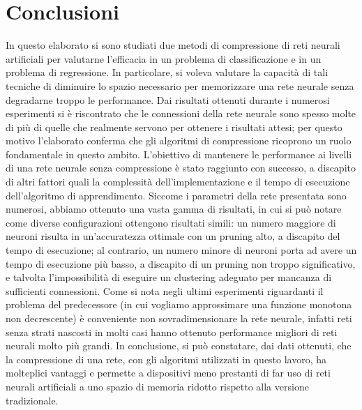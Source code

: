 \documentclass[11pt,a4paper,twoside,
openright]{book}
\begin{document}
	
	
	
\chapter*{Conclusioni}
In questo elaborato si sono studiati due metodi di compressione di reti neurali artificiali per valutarne l’efficacia in un problema di classificazione e in un problema di regressione. In particolare, si voleva valutare la capacità di tali tecniche di diminuire lo spazio necessario per memorizzare una rete neurale senza degradarne troppo le performance. Dai risultati ottenuti durante i numerosi esperimenti si è riscontrato che le connessioni della rete neurale sono spesso molte di più di quelle che realmente servono per ottenere i risultati attesi; per questo motivo l’elaborato conferma che gli algoritmi di compressione ricoprono un ruolo fondamentale in questo ambito. L’obiettivo di mantenere le performance ai livelli di una rete neurale senza compressione è stato raggiunto con successo, a discapito di altri fattori  quali la complessità dell’implementazione e il tempo di esecuzione dell'algoritmo di apprendimento. Siccome i parametri della rete presentata sono numerosi, abbiamo ottenuto una vasta gamma di risultati, in cui si può notare come diverse configurazioni ottengono risultati simili: un numero maggiore di neuroni risulta in un’accuratezza ottimale con un pruning alto, a discapito del tempo di esecuzione; al contrario, un numero minore di neuroni porta ad avere un tempo di esecuzione più basso, a discapito di un pruning non troppo significativo, e talvolta l’impossibilità di eseguire un clustering adeguato per mancanza di sufficienti connessioni. Come si nota negli ultimi esperimenti riguardanti il problema del predecessore (in cui vogliamo approssimare una funzione monotona non decrescente) è conveniente non sovradimensionare la rete neurale, infatti reti senza strati nascosti in molti casi hanno ottenuto performance migliori di reti neurali molto più grandi. In conclusione, si può constatare, dai dati ottenuti, che la compressione di una rete, con gli algoritmi utilizzati in questo lavoro, ha molteplici vantaggi e permette a dispositivi meno prestanti di far uso di reti neurali artificiali a uno spazio di memoria ridotto rispetto alla versione tradizionale.
{}

\end{document}
